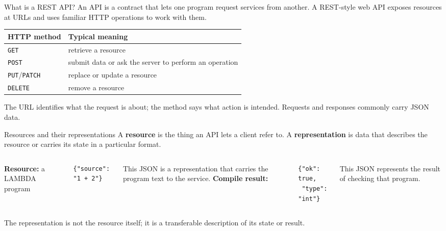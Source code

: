 \documentclass[aspectratio=169,11pt]{beamer}
\begin{document}
\begin{frame}{What is a REST API?}
An API is a contract that lets one program request services from another. A REST-style web API exposes resources at URLs and uses familiar HTTP operations to work with them.
\begin{center}
\begin{tabular}{ll}
\textbf{HTTP method} & \textbf{Typical meaning} \\
\hline
\texttt{GET} & retrieve a resource \\
\texttt{POST} & submit data or ask the server to perform an operation \\
\texttt{PUT}/\texttt{PATCH} & replace or update a resource \\
\texttt{DELETE} & remove a resource \\
\end{tabular}
\end{center}
The URL identifies what the request is about; the method says what action is intended. Requests and responses commonly carry JSON data.
\end{frame}

\begin{frame}[fragile]{Resources and their representations}
A \textbf{resource} is the thing an API lets a client refer to. A \textbf{representation} is data that describes the resource or carries its state in a particular format.
\begin{columns}[T]
\textbf{Resource:} a LAMBDA program
\begin{lstlisting}
{"source": "1 + 2"}
\end{lstlisting}
This JSON is a representation that carries the program text to the service.
\textbf{Compile result:}
\begin{lstlisting}
{"ok": true,
 "type": "int"}
\end{lstlisting}
This JSON represents the result of checking that program.
\end{columns}
The representation is not the resource itself; it is a transferable description of its state or result.
\end{frame}
\end{document}
